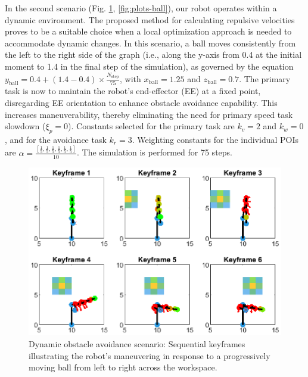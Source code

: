 \documentclass[letterpaper, 10 pt, conference]{ieeeconf}  %
\begin{document}
In the second scenario (Fig. \ref{fig:keyframes-3d-ball}, \ref{fig:plots-ball}), our robot operates within a dynamic environment. The proposed method for calculating repulsive velocities proves to be a suitable choice when a local optimization approach is needed to accommodate dynamic changes. In this scenario, a ball moves consistently from the left to the right side of the graph (i.e., along the y-axis from 0.4 at the initial moment to 1.4 in the final step of the simulation), as governed by the equation \( y_{\text{ball}} = 0.4 + (1.4 - 0.4) \times \frac{N_{\text{step}}}{75} \),  with \( x_{\text{ball}} = 1.25 \) and \( z_{\text{ball}} = 0.7 \). The primary task is now to maintain the robot's end-effector (EE) at a fixed point, disregarding EE orientation to enhance obstacle avoidance capability. This increases maneuverability, thereby eliminating the need for primary speed task slowdown (\( \xi_{p} = 0 \)). Constants selected for the primary task are \( k_v = 2 \) and \( k_w = 0 \), and for the avoidance task \( k_r = 3 \). Weighting constants for the individual POIs are \( \alpha = \frac{[ \frac{1}{5}, \frac{1}{5}, \frac{1}{5}, \frac{1}{5}, \frac{1}{5}, \frac{1}{5} ]}{10} \). The simulation is performed for 75 steps. 



\begin{figure}
	\centering
	\includegraphics[width=1\linewidth]{keyframes_2D_ball.eps} %
	\caption{Dynamic obstacle avoidance scenario: Sequential keyframes illustrating the robot’s maneuvering in response to a progressively moving ball from left to right across the workspace.}
	\label{fig:keyframes-3d-ball}
\end{figure}
\end{document}

